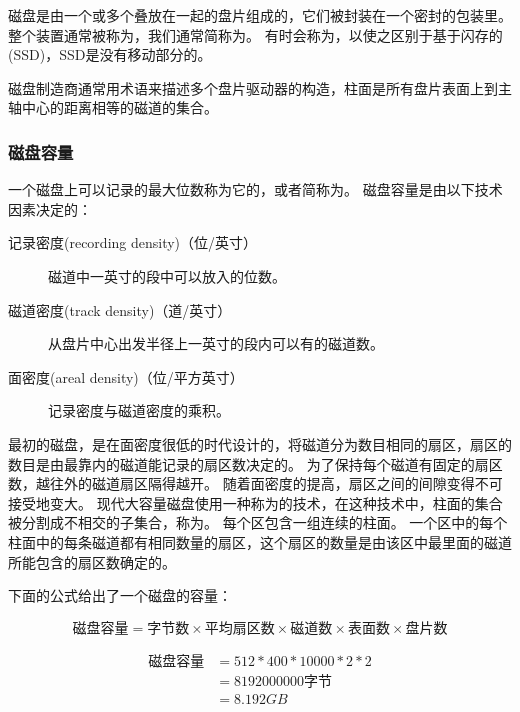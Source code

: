 {{{            磁盘是由一个或多个叠放在一起的盘片组成的，它们被封装在一个密封的包装里。
            整个装置通常被称为，我们通常简称为。
            有时会称为，以使之区别于基于闪存的(SSD)，SSD是没有移动部分的。

            磁盘制造商通常用术语来描述多个盘片驱动器的构造，柱面是所有盘片表面上到主轴中心的距离相等的磁道的集合。
        }

        \subsubsection{磁盘容量}
        {
            一个磁盘上可以记录的最大位数称为它的，或者简称为。
            磁盘容量是由以下技术因素决定的：

            \begin{description}
                \item[记录密度(recording density)（位/英寸）] 磁道中一英寸的段中可以放入的位数。
                \item[磁道密度(track density)（道/英寸）] 从盘片中心出发半径上一英寸的段内可以有的磁道数。
                \item[面密度(areal density)（位/平方英寸）] 记录密度与磁道密度的乘积。
            \end{description}

            最初的磁盘，是在面密度很低的时代设计的，将磁道分为数目相同的扇区，扇区的数目是由最靠内的磁道能记录的扇区数决定的。
            为了保持每个磁道有固定的扇区数，越往外的磁道扇区隔得越开。
            随着面密度的提高，扇区之间的间隙变得不可接受地变大。
            现代大容量磁盘使用一种称为的技术，在这种技术中，柱面的集合被分割成不相交的子集合，称为。
            每个区包含一组连续的柱面。
            一个区中的每个柱面中的每条磁道都有相同数量的扇区，这个扇区的数量是由该区中最里面的磁道所能包含的扇区数确定的。

            下面的公式给出了一个磁盘的容量：

            $$\text{磁盘容量} = \text{字节数} \times \text{平均扇区数} \times \text{磁道数} \times \text{表面数} \times \text{盘片数}$$

            \begin{practicec}
                \begin{align*}
                    \text{磁盘容量}
                    &= 512 * 400 * 10000 * 2 * 2 \\
                    &= 8192000000 \text{字节} \\
                    &= 8.192GB
                \end{align*}
            \end{practicec}
        }

}}
